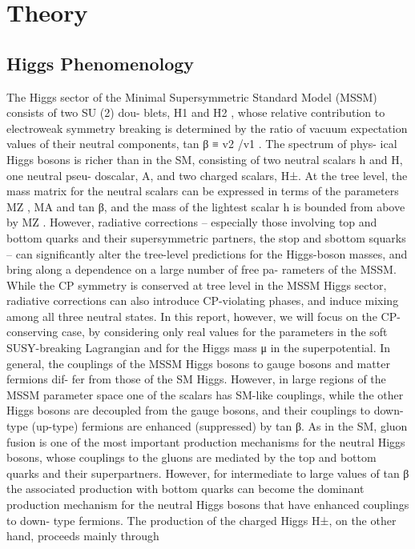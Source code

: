 \chapter{Theory}
\section{Higgs Phenomenology}

The Higgs sector of the Minimal Supersymmetric Standard Model (MSSM) consists of two SU (2) dou-
blets, H1 and H2 , whose relative contribution to electroweak symmetry breaking is determined by the
ratio of vacuum expectation values of their neutral components, tan β ≡ v2 /v1 . The spectrum of phys-
ical Higgs bosons is richer than in the SM, consisting of two neutral scalars h and H, one neutral pseu-
doscalar, A, and two charged scalars, H±. At the tree level, the mass matrix for the neutral scalars can be
expressed in terms of the parameters MZ , MA and tan β, and the mass of the lightest scalar h is bounded
from above by MZ . However, radiative corrections – especially those involving top and bottom quarks
and their supersymmetric partners, the stop and sbottom squarks – can significantly alter the tree-level
predictions for the Higgs-boson masses, and bring along a dependence on a large number of free pa-
rameters of the MSSM. While the CP symmetry is conserved at tree level in the MSSM Higgs sector,
radiative corrections can also introduce CP-violating phases, and induce mixing among all three neutral
states. In this report, however, we will focus on the CP-conserving case, by considering only real values
for the parameters in the soft SUSY-breaking Lagrangian and for the Higgs mass μ in the superpotential.
In general, the couplings of the MSSM Higgs bosons to gauge bosons and matter fermions dif-
fer from those of the SM Higgs. However, in large regions of the MSSM parameter space one of the
scalars has SM-like couplings, while the other Higgs bosons are decoupled from the gauge bosons, and
their couplings to down-type (up-type) fermions are enhanced (suppressed) by tan β. As in the SM,
gluon fusion is one of the most important production mechanisms for the neutral Higgs bosons, whose
couplings to the gluons are mediated by the top and bottom quarks and their superpartners. However,
for intermediate to large values of tan β the associated production with bottom quarks can become the
dominant production mechanism for the neutral Higgs bosons that have enhanced couplings to down-
type fermions. The production of the charged Higgs H±, on the other hand, proceeds mainly through

